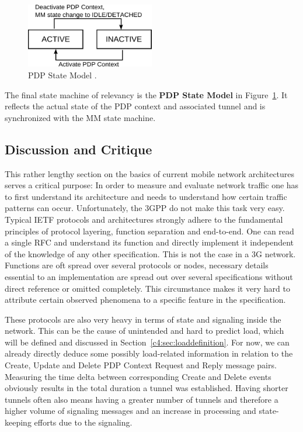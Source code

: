 
\begin{figure}[htb]
	\centering
	\includegraphics[width=0.5\textwidth]{images/pdp-state-model.pdf}
	\caption{\gls{PDP} State Model \cite[Section~9]{3gpp.23.060}.}
	\label{c4:fig:pdpstatemodel}
\end{figure}

The final state machine of relevancy is the \textbf{\gls{PDP} State Model} \cite[Section~9]{3gpp.23.060} in Figure~\ref{c4:fig:pdpstatemodel}. It reflects the actual state of the \gls{PDP} context and associated tunnel and is synchronized with the \gls{MM} state machine.


\subsection{Discussion and Critique}%

This rather lengthy section on the basics of current mobile network architectures serves a critical purpose: In order to measure and evaluate network traffic one has to first understand its architecture and needs to understand how certain traffic patterns can occur. Unfortunately, the \gls{3GPP} do not make this task very easy. Typical \gls{IETF} protocols and architectures  strongly adhere to the fundamental principles of protocol layering, function separation and end-to-end. One can read a single \gls{RFC} and understand its function and directly implement it independent of the knowledge of any other specification. This is not the case in a \gls{3G} network. Functions are oft spread over several protocols or nodes, necessary details essential to an implementation are spread out over several specifications without direct reference or omitted completely. This circumstance makes it very hard to attribute certain observed phenomena to a specific feature in the specification.

These protocols are also very heavy in terms of state and signaling inside the network. This can be the cause of unintended and hard to predict load, which will be defined and discussed in Section~\ref{c4:sec:loaddefinition}. For now, we can already directly deduce some possibly load-related information in relation to the Create, Update and Delete \gls{PDP} Context Request and Reply message pairs. Measuring the time delta between corresponding Create and Delete events obviously results in the total duration a tunnel was established. Having shorter tunnels often also means having a greater number of tunnels and therefore a higher volume of signaling messages and an increase in processing and state-keeping efforts due to the signaling. 

